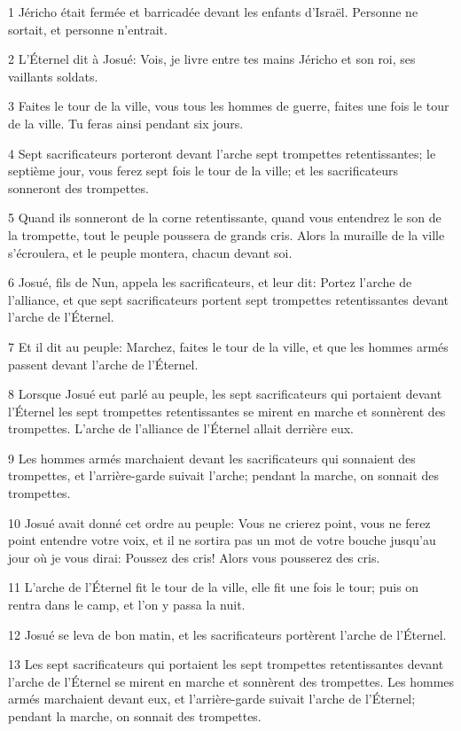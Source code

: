 \par 1 Jéricho était fermée et barricadée devant les enfants d'Israël. Personne ne sortait, et personne n'entrait.
\par 2 L'Éternel dit à Josué: Vois, je livre entre tes mains Jéricho et son roi, ses vaillants soldats.
\par 3 Faites le tour de la ville, vous tous les hommes de guerre, faites une fois le tour de la ville. Tu feras ainsi pendant six jours.
\par 4 Sept sacrificateurs porteront devant l'arche sept trompettes retentissantes; le septième jour, vous ferez sept fois le tour de la ville; et les sacrificateurs sonneront des trompettes.
\par 5 Quand ils sonneront de la corne retentissante, quand vous entendrez le son de la trompette, tout le peuple poussera de grands cris. Alors la muraille de la ville s'écroulera, et le peuple montera, chacun devant soi.
\par 6 Josué, fils de Nun, appela les sacrificateurs, et leur dit: Portez l'arche de l'alliance, et que sept sacrificateurs portent sept trompettes retentissantes devant l'arche de l'Éternel.
\par 7 Et il dit au peuple: Marchez, faites le tour de la ville, et que les hommes armés passent devant l'arche de l'Éternel.
\par 8 Lorsque Josué eut parlé au peuple, les sept sacrificateurs qui portaient devant l'Éternel les sept trompettes retentissantes se mirent en marche et sonnèrent des trompettes. L'arche de l'alliance de l'Éternel allait derrière eux.
\par 9 Les hommes armés marchaient devant les sacrificateurs qui sonnaient des trompettes, et l'arrière-garde suivait l'arche; pendant la marche, on sonnait des trompettes.
\par 10 Josué avait donné cet ordre au peuple: Vous ne crierez point, vous ne ferez point entendre votre voix, et il ne sortira pas un mot de votre bouche jusqu'au jour où je vous dirai: Poussez des cris! Alors vous pousserez des cris.
\par 11 L'arche de l'Éternel fit le tour de la ville, elle fit une fois le tour; puis on rentra dans le camp, et l'on y passa la nuit.
\par 12 Josué se leva de bon matin, et les sacrificateurs portèrent l'arche de l'Éternel.
\par 13 Les sept sacrificateurs qui portaient les sept trompettes retentissantes devant l'arche de l'Éternel se mirent en marche et sonnèrent des trompettes. Les hommes armés marchaient devant eux, et l'arrière-garde suivait l'arche de l'Éternel; pendant la marche, on sonnait des trompettes.
